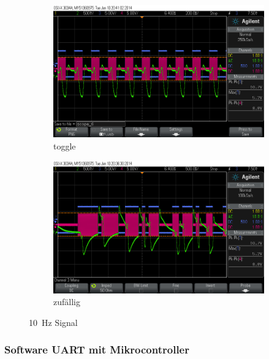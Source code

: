 \documentclass[12pt,a4paper]{article}
\begin{document}
\begin{figure}[H]
  \centering
  \begin{subfigure}[b]{0.6\textwidth}
    \includegraphics[width=\textwidth]{../measurements/20140610/10Hz_toggle/scope_6.png}
    \caption{toggle}
    \label{fig:uart_10hz_toggle}
  \end{subfigure}
  \begin{subfigure}[b]{0.6\textwidth}
    \includegraphics[width=\textwidth]{../measurements/20140610/10Hz_random/scope_4.png}
    \caption{zufällig}
    \label{fig:uart_10hz_random}
  \end{subfigure}
  \caption{\SI{10}{\hertz} Signal}
\end{figure}

\subsubsection{Software UART mit Mikrocontroller}
\end{document}
